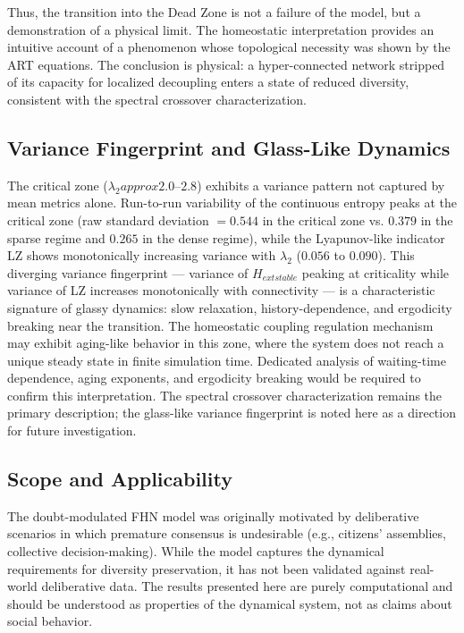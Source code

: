 \documentclass[11pt]{article}
\begin{document}
Thus, the transition into the Dead Zone is not a failure of the model, but a demonstration of a physical limit. The homeostatic interpretation provides an intuitive account of a phenomenon whose topological necessity was shown by the ART equations. The conclusion is physical: a hyper-connected network stripped of its capacity for localized decoupling enters a state of reduced diversity, consistent with the spectral crossover characterization.



\subsection{Variance Fingerprint and Glass-Like Dynamics}

The critical zone ($\lambda_2 approx 2.0$--$2.8$) exhibits a variance pattern not captured by mean metrics alone. Run-to-run variability of the continuous entropy peaks at the critical zone (raw standard deviation $= 0.544$ in the critical zone vs. $0.379$ in the sparse regime and $0.265$ in the dense regime), while the Lyapunov-like indicator LZ shows monotonically increasing variance with $\lambda_2$ ($0.056$ to $0.090$). This diverging variance fingerprint --- variance of $H_{	ext{stable}}$ peaking at criticality while variance of LZ increases monotonically with connectivity --- is a characteristic signature of glassy dynamics: slow relaxation, history-dependence, and ergodicity breaking near the transition. The homeostatic coupling regulation mechanism may exhibit aging-like behavior in this zone, where the system does not reach a unique steady state in finite simulation time. Dedicated analysis of waiting-time dependence, aging exponents, and ergodicity breaking would be required to confirm this interpretation. The spectral crossover characterization remains the primary description; the glass-like variance fingerprint is noted here as a direction for future investigation.

\subsection{Scope and Applicability}

The doubt-modulated FHN model was originally motivated by deliberative scenarios in which premature consensus is undesirable (e.g., citizens' assemblies, collective decision-making). While the model captures the dynamical requirements for diversity preservation, it has not been validated against real-world deliberative data. The results presented here are purely computational and should be understood as properties of the dynamical system, not as claims about social behavior.
\end{document}

